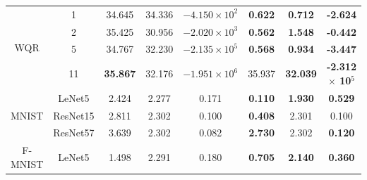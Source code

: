 \begin{table}[tbp]
{\begin{tabular}{|c|c|ccc|ccc|}
\multirow{4}{*}{WQR}               & 1                                & \multicolumn{1}{c|}{34.645}         & \multicolumn{1}{c|}{34.336}  & $-4.150 \times 10^{2}$ & \multicolumn{1}{c|}{\textbf{0.622}}   & \multicolumn{1}{c|}{\textbf{0.712}}   & \textbf{-2.624}                   \\ \cline{2-8} 
                                   & 2                                & \multicolumn{1}{c|}{35.425}         & \multicolumn{1}{c|}{30.956}  & $-2.020 \times 10^{3}$ & \multicolumn{1}{c|}{\textbf{0.562}}   & \multicolumn{1}{c|}{\textbf{1.548}}   & \textbf{-0.442}                   \\ \cline{2-8} 
                                   & 5                                & \multicolumn{1}{c|}{34.767}         & \multicolumn{1}{c|}{32.230}  & $-2.135 \times 10^{5}$ & \multicolumn{1}{c|}{\textbf{0.568}}   & \multicolumn{1}{c|}{\textbf{0.934}}   & \textbf{-3.447}                   \\ \cline{2-8} 
                                   & 11                               & \multicolumn{1}{c|}{\textbf{35.867}}         & \multicolumn{1}{c|}{32.176}  & $-1.951 \times 10^{6}$ & \multicolumn{1}{c|}{35.937}  & \multicolumn{1}{c|}{\textbf{32.039}}  & \textbf{-2.312 $\times$ 10$^{5}$} \\ \hline
\multirow{3}{*}{MNIST}             & LeNet5                           & \multicolumn{1}{c|}{2.424}          & \multicolumn{1}{c|}{2.277}   & 0.171                  & \multicolumn{1}{c|}{\textbf{0.110}}   & \multicolumn{1}{c|}{\textbf{1.930}}   & \textbf{0.529}                    \\ \cline{2-8} 
                                   & ResNet15                         & \multicolumn{1}{c|}{2.811}          & \multicolumn{1}{c|}{2.302}   & 0.100                  & \multicolumn{1}{c|}{\textbf{0.408}}   & \multicolumn{1}{c|}{2.301}            & 0.100                             \\ \cline{2-8} 
                                   & ResNet57                         & \multicolumn{1}{c|}{3.639}          & \multicolumn{1}{c|}{2.302}   & 0.082                  & \multicolumn{1}{c|}{\textbf{2.730}}   & \multicolumn{1}{c|}{2.302}            & \textbf{0.120}                    \\ \hline
\multirow{3}{*}{F-MNIST}           & LeNet5                           & \multicolumn{1}{c|}{1.498}          & \multicolumn{1}{c|}{2.291}   & 0.180                  & \multicolumn{1}{c|}{\textbf{0.705}}   & \multicolumn{1}{c|}{\textbf{2.140}}   & \textbf{0.360}                    \\ \cline{2-8} 

\end{tabular}}
\end{table}
